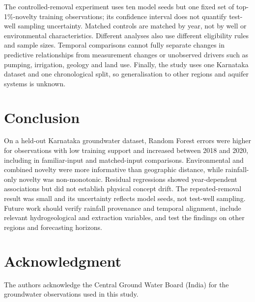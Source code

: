 \documentclass[conference]{IEEEtran}
\begin{document}
The controlled-removal experiment uses ten model seeds but one fixed set of top-1\%-novelty training observations; its confidence interval does not quantify test-well sampling uncertainty. Matched controls are matched by year, not by well or environmental characteristics. Different analyses also use different eligibility rules and sample sizes. Temporal comparisons cannot fully separate changes in predictive relationships from measurement changes or unobserved drivers such as pumping, irrigation, geology and land use. Finally, the study uses one Karnataka dataset and one chronological split, so generalisation to other regions and aquifer systems is unknown.

\section{Conclusion}
On a held-out Karnataka groundwater dataset, Random Forest errors were higher for observations with low training support and increased between 2018 and 2020, including in familiar-input and matched-input comparisons. Environmental and combined novelty were more informative than geographic distance, while rainfall-only novelty was non-monotonic. Residual regressions showed year-dependent associations but did not establish physical concept drift. The repeated-removal result was small and its uncertainty reflects model seeds, not test-well sampling. Future work should verify rainfall provenance and temporal alignment, include relevant hydrogeological and extraction variables, and test the findings on other regions and forecasting horizons.

\section*{Acknowledgment}
The authors acknowledge the Central Ground Water Board (India) for the groundwater observations used in this study.
\end{document}

